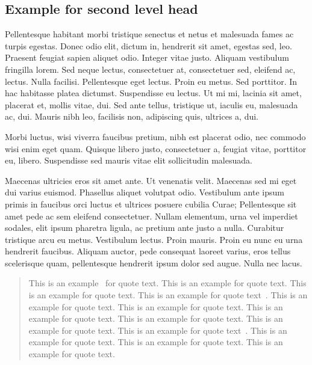 \documentclass[AMS,STIX2COL]{WileyNJD-v2}
\begin{document}
    \subsection{Example for second level head}

    Pellentesque habitant morbi tristique senectus et netus et malesuada fames ac turpis egestas. Donec odio elit, dictum
    in, hendrerit sit amet, egestas sed, leo. Praesent feugiat sapien aliquet odio. Integer vitae justo. Aliquam vestibulum fringilla lorem. Sed neque lectus, consectetuer at, consectetuer sed, eleifend ac, lectus. Nulla facilisi. Pellentesque
    eget lectus. Proin eu metus. Sed porttitor. In hac habitasse platea dictumst. Suspendisse eu lectus. Ut mi mi, lacinia
    sit amet, placerat et, mollis vitae, dui. Sed ante tellus, tristique ut, iaculis eu, malesuada ac, dui. Mauris nibh leo,
    facilisis non, adipiscing quis, ultrices a, dui.

    Morbi luctus, wisi viverra faucibus pretium, nibh est placerat odio, nec commodo wisi enim eget quam. Quisque libero justo, consectetuer a, feugiat vitae, porttitor eu, libero. Suspendisse sed mauris vitae elit sollicitudin malesuada.

    Maecenas ultricies eros sit amet ante. Ut venenatis velit. Maecenas sed mi eget dui varius euismod. Phasellus aliquet
    volutpat odio. Vestibulum ante ipsum primis in faucibus orci luctus et ultrices posuere cubilia Curae; Pellentesque sit amet pede ac sem eleifend consectetuer. Nullam elementum, urna vel imperdiet sodales, elit ipsum pharetra ligula,
    ac pretium ante justo a nulla. Curabitur tristique arcu eu metus. Vestibulum lectus. Proin mauris. Proin eu nunc eu urna hendrerit faucibus. Aliquam auctor, pede consequat laoreet varius, eros tellus scelerisque quam, pellentesque hendrerit ipsum dolor sed augue. Nulla nec lacus.

    \begin{quote}
        This is an example~\citep{Elbaum2002,Blanchard2015} for quote text. This is an example for quote text. This is an example for quote text. This is an example for quote text~\cite{Blanchard2015}. This is an example for quote text. This is an example for quote text. This is an example for quote text. This is an example for quote text. This is an example for quote text. This is an example for quote text~\cite{Blanchard2015}. This is an example for quote text. This is an example for quote text. This is an example for quote text.
    \end{quote}
\end{document}
